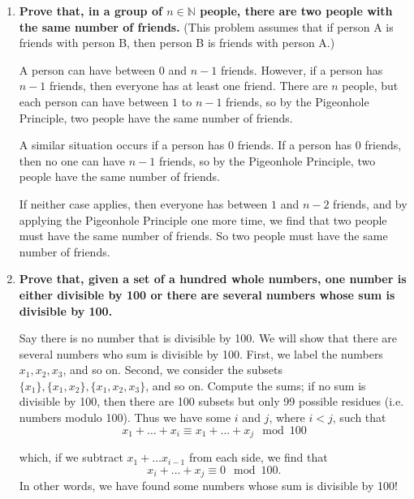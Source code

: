 \begin{enumerate}
\item \textbf{Prove that, in a group of $n \in \mathbb{N}$ people, there are two people with the same number of friends.} 
(This problem assumes that if person A is friends with person B, then person B is friends with person A.)

A person can have between $0$ and $n-1$ friends. 
However, if a person has $n - 1$ friends, then everyone has at least one friend.
There are $n$ people, but each person can have between $1$ to $n-1$ friends, so by the Pigeonhole Principle, two people have the same number of friends.

A similar situation occurs if a person has $0$ friends. 
If a person has $0$ friends, then no one can have $n-1$ friends, so by the Pigeonhole Principle, two people have the same number of friends.

If neither case applies, then everyone has between $1$ and $n-2$ friends, and by applying the Pigeonhole Principle one more time, we find that two people must have the same number of friends. So two people must have the same number of friends.

\item \textbf{Prove that, given a set of a hundred whole numbers, one number is either divisible by 100 or there are several numbers whose sum is divisible by 100.}

Say there is no number that is divisible by 100.
We will show that there are several numbers who sum is divisible by 100.
First, we label the numbers $x_1, x_2, x_3$, and so on.
Second, we consider the subsets $\{x_1\}, \{x_1, x_2\}, \{x_1, x_2, x_3\}$, and so on.
Compute the sums; if no sum is divisible by 100, then there are 100 subsets but only 99 possible residues (i.e. numbers modulo 100). 
Thus we have some $i$ and $j$, where $i < j$, such that 
\[ x_1 + \dots + x_i \equiv x_1 + \dots + x_j \mod 100\]

which, if we subtract $x_1 + \dots x_{i - 1}$ from each side, we find that
\[ x_i + \dots + x_j \equiv 0 \mod 100. \]
In other words, we have found some numbers whose sum is divisible by 100!
\end{enumerate}


